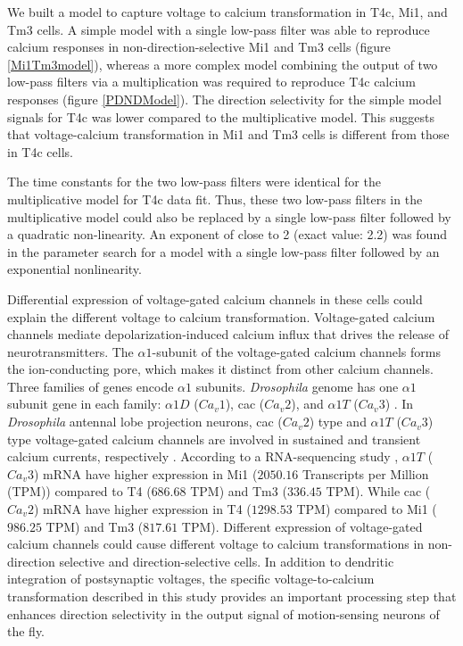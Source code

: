 \documentclass[9pt,lineno]{elife}
\begin{document}
We built a model to capture voltage to calcium transformation in T4c, Mi1, and Tm3 cells. A simple model with a single low-pass filter was able to reproduce calcium responses in non-direction-selective Mi1 and Tm3 cells (figure \ref{Mi1Tm3model}), whereas a more complex model combining the output of two low-pass filters via a multiplication was required to reproduce T4c calcium responses (figure \ref{PDNDModel}). The direction selectivity for the simple model signals for T4c was lower compared to the multiplicative model. This suggests that voltage-calcium transformation in Mi1 and Tm3 cells is different from those in T4c cells. 

The time constants for the two low-pass filters were identical for the multiplicative model for T4c data fit. Thus, these two low-pass filters in the multiplicative model could also be replaced by a single low-pass filter followed by a quadratic non-linearity. An exponent of close to 2 (exact value: 2.2) was found in the parameter search for a model with a single low-pass filter followed by an exponential nonlinearity.  


Differential expression of voltage-gated calcium channels in these cells could explain the different voltage to calcium transformation. Voltage-gated calcium channels mediate depolarization-induced calcium influx that drives the release of neurotransmitters. The $\alpha1$-subunit of the voltage-gated calcium channels forms the ion-conducting pore, which makes it distinct from other calcium channels. Three families of genes encode $\alpha1$ subunits. \textit{Drosophila} genome has one $\alpha1$ subunit gene in each family: $\alpha1D$ ($Ca_{v}1$), cac ($Ca_{v}2$), and $\alpha1T$ ($Ca_{v}3$) \parencite{Littleton2000, King2007}. In \textit{Drosophila} antennal lobe projection neurons, cac ($Ca_{v}2$) type and $\alpha1T$ ($Ca_{v}3$) type voltage-gated calcium channels are involved in sustained and transient calcium currents, respectively \parencite{Gu2009, Iniguez2013}. According to a RNA-sequencing study \parencite{Davis2020}, $\alpha1T$ ($Ca_{v}3$) mRNA have higher expression in Mi1 ($2050.16$ Transcripts per Million (TPM)) compared to T4 ($686.68$ TPM) and Tm3 ($336.45$ TPM). While cac ($Ca_{v}2$) mRNA have higher expression in T4 ($1298.53$ TPM) compared to Mi1 ($986.25$ TPM) and Tm3 ($817.61$ TPM). Different expression of voltage-gated calcium channels could cause different voltage to calcium transformations in non-direction selective and direction-selective cells. In addition to dendritic integration of postsynaptic voltages, the specific voltage-to-calcium transformation described in this study provides an important processing step that enhances direction selectivity in the output signal of motion-sensing neurons of the fly. 
\end{document}
